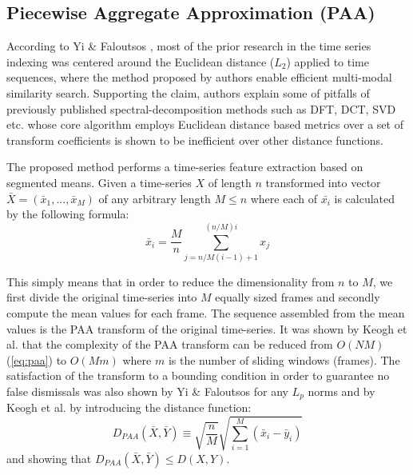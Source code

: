 \subsection{Piecewise Aggregate Approximation (PAA)} \label{paa}
According to Yi \& Faloutsos \cite{citeulike:2946589}, most of the prior research in the time series indexing was centered around the Euclidean distance ($L_{2}$) applied to time sequences, where the method proposed by authors enable efficient multi-modal similarity search. Supporting the claim, authors explain some of pitfalls of previously published spectral-decomposition methods such as DFT, DCT, SVD etc. whose core algorithm employs Euclidean distance based metrics over a set of transform coefficients is shown to be inefficient over other distance functions.

The proposed method performs a time-series feature extraction based on segmented means. Given a time-series $X$ of length $n$ transformed into vector $\bar{X} = ( \bar{x}_{1}, ..., \bar{x}_{M} )$ of any arbitrary length $M \leq n$ where each of $\bar{x_{i}}$ is calculated by the following formula:
\begin{equation}
\bar{x}_{i} = \frac{M}{n} \sum_{j=n/M(i-1)+1}^{(n/M)i} x_{j}
\label{eq:paa}
\end{equation}

This simply means that in order to reduce the dimensionality from $n$ to $M$, we first divide the original time-series into $M$ equally sized frames and secondly compute the mean values for each frame. The sequence assembled from the mean values is the PAA transform of the original time-series. It was shown by Keogh et al. that the complexity of the PAA transform can be reduced from $O(NM)$ (\ref{eq:paa}) to $O(Mm)$ where $m$ is the number of sliding windows (frames). The satisfaction of the transform to a bounding condition in order to guarantee no false dismissals was also shown by Yi \& Faloutsos for any $L_{p}$ norms and by Keogh et al. \cite{citeulike:3000416} by introducing the distance function:
\begin{equation}
D_{PAA}(\bar{X}, \bar{Y}) \equiv \sqrt{\frac{n}{M}} \sqrt{ \sum_{i=1}^{M} 
\left(  \bar{x}_{i} - \bar{y}_{i} \right)}
\label{eq:paa_distance}
\end{equation}
and showing that $D_{PAA}(\bar{X}, \bar{Y}) \leq D(X,Y)$.

